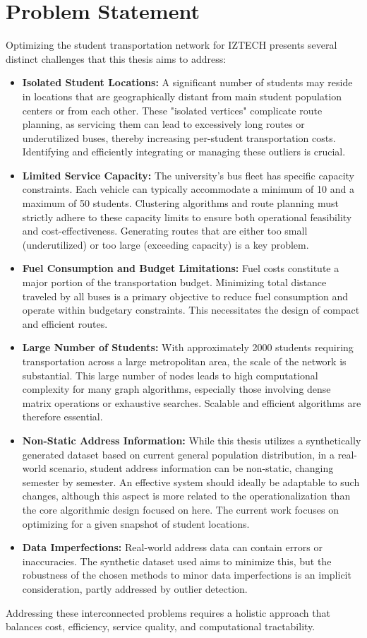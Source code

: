 \section{Problem Statement}
\label{sec:intro_problems}
Optimizing the student transportation network for IZTECH presents several distinct challenges that this thesis aims to address:

\begin{itemize}
    \item \textbf{Isolated Student Locations:} A significant number of students may reside in locations that are geographically distant from main student population centers or from each other. These "isolated vertices" complicate route planning, as servicing them can lead to excessively long routes or underutilized buses, thereby increasing per-student transportation costs. Identifying and efficiently integrating or managing these outliers is crucial.
    \item \textbf{Limited Service Capacity:} The university's bus fleet has specific capacity constraints. Each vehicle can typically accommodate a minimum of 10 and a maximum of 50 students. Clustering algorithms and route planning must strictly adhere to these capacity limits to ensure both operational feasibility and cost-effectiveness. Generating routes that are either too small (underutilized) or too large (exceeding capacity) is a key problem.
    \item \textbf{Fuel Consumption and Budget Limitations:} Fuel costs constitute a major portion of the transportation budget. Minimizing total distance traveled by all buses is a primary objective to reduce fuel consumption and operate within budgetary constraints. This necessitates the design of compact and efficient routes.
    \item \textbf{Large Number of Students:} With approximately 2000 students requiring transportation across a large metropolitan area, the scale of the network is substantial. This large number of nodes leads to high computational complexity for many graph algorithms, especially those involving dense matrix operations or exhaustive searches. Scalable and efficient algorithms are therefore essential.
    \item \textbf{Non-Static Address Information:} While this thesis utilizes a synthetically generated dataset based on current general population distribution, in a real-world scenario, student address information can be non-static, changing semester by semester. An effective system should ideally be adaptable to such changes, although this aspect is more related to the operationalization than the core algorithmic design focused on here. The current work focuses on optimizing for a given snapshot of student locations.
    \item \textbf{Data Imperfections:} Real-world address data can contain errors or inaccuracies. The synthetic dataset used aims to minimize this, but the robustness of the chosen methods to minor data imperfections is an implicit consideration, partly addressed by outlier detection.
\end{itemize}
Addressing these interconnected problems requires a holistic approach that balances cost, efficiency, service quality, and computational tractability.

